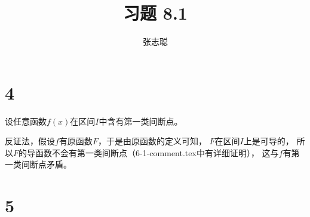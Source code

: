 \documentclass{article}
\begin{document}
\title{习题 8.1}
\author{张志聪}
\maketitle

\section*{4}

设任意函数$f(x)$在区间$I$中含有第一类间断点。

反证法，假设$f$有原函数$F$，于是由原函数的定义可知，
$F$在区间$I$上是可导的，
所以$F$的导函数不会有第一类间断点（6-1-comment.tex中有详细证明），
这与$f$有第一类间断点矛盾。

\section*{5}
\end{document}
